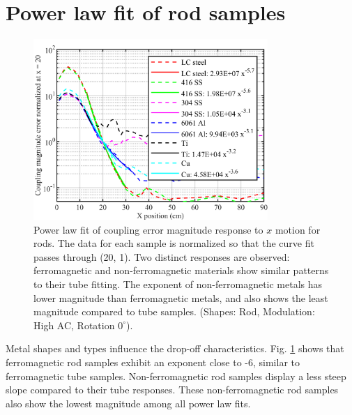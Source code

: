\documentclass{article}
\begin{document}
\section{Power law fit of rod samples}
\label{supplement:rod_fitting}
\begin{figure}[!htbp]
\centerline{\includegraphics[width= 3.5in]{chaicS3.png}}
\caption{Power law fit of coupling error magnitude response to $x$ motion for rods. The data for each sample is normalized so that the curve fit passes through (20, 1). Two distinct responses are observed: ferromagnetic and non-ferromagnetic materials show similar patterns to their tube fitting. The exponent of non-ferromagnetic metals has lower magnitude than ferromagnetic metals, and also shows the least magnitude compared to tube samples. 
(Shapes: Rod, Modulation: High AC, Rotation $0^\circ$).}
\label{rod_fit}
\end{figure} 

Metal shapes and types influence the drop-off characteristics. Fig. \ref{rod_fit} shows that ferromagnetic rod samples exhibit an exponent close to -6, similar to ferromagnetic tube samples. Non-ferromagnetic rod samples display a less steep slope compared to their tube responses. These non-ferromagnetic rod samples also show the lowest magnitude among all power law fits.
\end{document}
